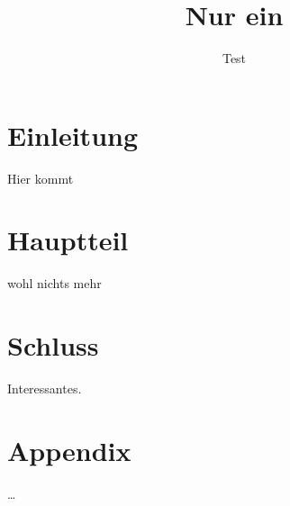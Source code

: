 \documentclass[accentcolor=tud0b,12pt,paper=a4]{tudreport}
\title{Nur ein}
\subtitle{Test}
\begin{document}
    \maketitle
    \tableofcontents

    \chapter{Einleitung}
        Hier kommt

    \chapter{Hauptteil}
        wohl nichts mehr

    \chapter{Schluss}
        Interessantes.
\appendix
    \chapter{Appendix}
        \ldots
\end{document}
